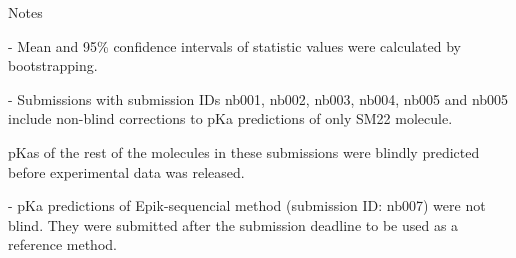 \documentclass{article}
\begin{document}
Notes

- Mean and 95\% confidence intervals of statistic values were calculated by bootstrapping.

- Submissions with submission IDs nb001, nb002, nb003, nb004, nb005 and nb005 include non-blind corrections to pKa predictions of only SM22 molecule. 

pKas of the rest of the molecules in these submissions were blindly predicted before experimental data was released.

- pKa predictions of Epik-sequencial method (submission ID: nb007) were not blind. They were submitted after the submission deadline to be used as a reference method.
\end{document}
